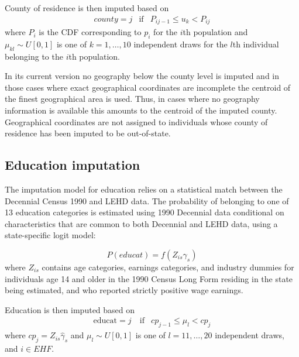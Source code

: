 County of residence is then imputed based on
%
\begin{eqnarray}
  \label{eq:county_impute}
  county = j &\text{if}& P_{ij - 1} \le u_k < P_{ij} 
\end{eqnarray}
%
where $P_i $ is the CDF corresponding to $p_i $ for the $i$th population
and $\mu _{kl} \sim U[0,1]$ is one of $k = 1,\ldots,10$ independent draws for
the $l$th individual belonging to the $i$th population.

In its current version no geography below the county level is imputed and
in those cases where exact geographical coordinates are incomplete the
centroid of the finest geographical area is used. Thus, in cases where no
geography information is available this amounts to the centroid of the
imputed county. Geographical coordinates are not assigned to individuals
whose county of residence has been imputed to be out-of-state.

%
%

\subsection{Education imputation}


The imputation model for education relies on a statistical match between
the Decennial Census 1990 and LEHD data. The probability of belonging to
one of 13 education categories is estimated using 1990 Decennial data
conditional on characteristics that are common to both Decennial and LEHD
data, using a state-specific logit
model:

\begin{equation}
  \label{eq:logit:educat}
  P(educat)=f(Z_{is}\gamma_s)
\end{equation}
where $Z_{is}$ contains age categories, earnings categories, and industry
dummies for individuals age 14 and older in the 1990 Census Long Form
residing in the state being estimated, and who reported strictly positive
wage earnings.

Education is then imputed based on
\begin{eqnarray}
  \label{eq:impute:educat}
  \text{educat}=j &~\text{if} & {cp}_{j-1} \leq \mu_l < {cp}_{j} 
\end{eqnarray}
where $cp_{j}=Z_{is}\hat{\gamma}_s$ and $\mu_l \sim U[0,1]$ is one of  $l =
11,\dots,20$ independent draws, and $i \in EHF$.


